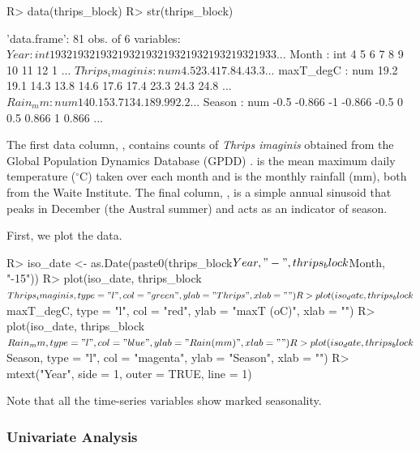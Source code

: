 \documentclass[article]{jss}
\begin{document}
\begin{Schunk}
\begin{Sinput}
R> data(thrips_block)
R> str(thrips_block)
\end{Sinput}
\begin{Soutput}
'data.frame':	81 obs. of  6 variables:
 $ Year           : int  1932 1932 1932 1932 1932 1932 1932 1932 1932 1933 ...
 $ Month          : int  4 5 6 7 8 9 10 11 12 1 ...
 $ Thrips_imaginis: num  4.5 23.4 17.8 4.4 3.3 ...
 $ maxT_degC      : num  19.2 19.1 14.3 13.8 14.6 17.6 17.4 23.3 24.3 24.8 ...
 $ Rain_mm        : num  140.1 53.7 134.1 89.9 92.2 ...
 $ Season         : num  -0.5 -0.866 -1 -0.866 -0.5 0 0.5 0.866 1 0.866 ...
\end{Soutput}
\end{Schunk}

The first data column, , contains counts of \emph{Thrips imaginis} obtained from the Global Population Dynamics Database (GPDD) \citep{NERC-Centre-for-Population-Biology_2010}.  is the mean maximum daily temperature ($^\circ$C) taken over each month and  is the monthly rainfall (mm), both from the Waite Institute. The final column, , is a simple annual sinusoid that peaks in December (the Austral summer) and acts as an indicator of season.

First, we plot the data.


\begin{Schunk}
\begin{Sinput}
R> iso_date <- as.Date(paste0(thrips_block$Year, "-", thrips_block$Month, "-15"))
R> plot(iso_date, thrips_block$Thrips_imaginis, type = "l", col = "green", ylab = "Thrips", xlab = "")
R> plot(iso_date, thrips_block$maxT_degC, type = "l", col = "red", ylab = "maxT (oC)", xlab = "")
R> plot(iso_date, thrips_block$Rain_mm, type = "l", col = "blue", ylab = "Rain (mm)", xlab = "")
R> plot(iso_date, thrips_block$Season, type = "l", col = "magenta", ylab = "Season", xlab = "")
R> mtext("Year", side = 1, outer = TRUE, line = 1)
\end{Sinput}
\end{Schunk}


Note that all the time-series variables show marked seasonality.

\subsubsection{Univariate Analysis}\label{sec:thrips-univariate}
\end{document}
